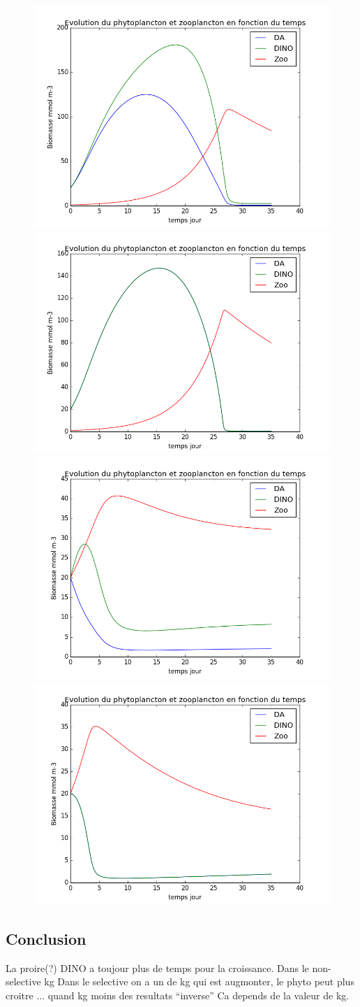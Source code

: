 \begin{figure}
  \includegraphics[width=.5\textwidth]{partie2/test3sel.png}\hfill
  \includegraphics[width=.5\textwidth]{partie2/test3nonsel.png}\\
  \includegraphics[width=.5\textwidth]{partie2/test4sel.png}\hfill
  \includegraphics[width=.5\textwidth]{partie2/test4nonsel.png}
  \caption{\todo}
  \label{fig:partie2Test2}
\end{figure}

\subsection{Conclusion}

\par{
La proire(?) DINO a toujour plus de temps pour la croissance.
Dans le non-selective kg
Dans le selective on a un de kg qui est augmonter, le phyto peut plus croitre ...
quand kg moins
des resultats ``inverse''
Ca depends de la valeur de kg.
}
